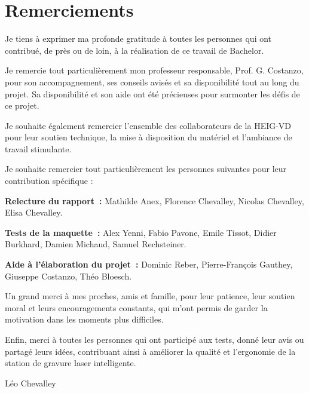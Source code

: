 \chapter*{Remerciements}

Je tiens à exprimer ma profonde gratitude à toutes les personnes qui ont contribué, de près ou de loin, à la réalisation de ce travail de Bachelor.

Je remercie tout particulièrement mon professeur responsable, Prof. G. Costanzo, pour son accompagnement, ses conseils avisés et sa disponibilité tout au long du projet. Sa disponibilité et son aide ont été précieuses pour surmonter les défis de ce projet.

Je souhaite également remercier l’ensemble des collaborateurs de la HEIG-VD pour leur soutien technique, la mise à disposition du matériel et l’ambiance de travail stimulante.

Je souhaite remercier tout particulièrement les personnes suivantes pour leur contribution spécifique :

\textbf{Relecture du rapport~:} Mathilde Anex, Florence Chevalley, Nicolas Chevalley, Elisa Chevalley.

\textbf{Tests de la maquette~:} Alex Yenni, Fabio Pavone, Emile Tissot, Didier Burkhard, Damien Michaud, Samuel Rechsteiner.

\textbf{Aide à l'élaboration du projet~:} Dominic Reber, Pierre-François Gauthey, Giuseppe Costanzo, Théo Bloesch.

Un grand merci à mes proches, amis et famille, pour leur patience, leur soutien moral et leurs encouragements constants, qui m’ont permis de garder la motivation dans les moments plus difficiles.

Enfin, merci à toutes les personnes qui ont participé aux tests, donné leur avis ou partagé leurs idées, contribuant ainsi à améliorer la qualité et l’ergonomie de la station de gravure laser intelligente.

\vspace{1cm}
\begin{flushright}
    Léo Chevalley
\end{flushright}
